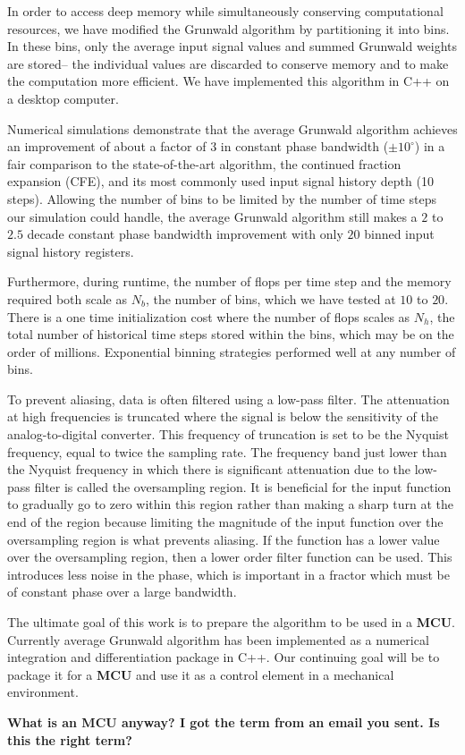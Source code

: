 In order to access deep memory while simultaneously conserving computational resources, we have modified the Grunwald algorithm by partitioning it into bins. In these bins, only the average input signal values and summed Grunwald weights are stored-- the individual values are discarded to conserve memory and to make the computation more efficient. We have implemented this algorithm in C++ on a desktop computer. 

Numerical simulations demonstrate that the average Grunwald algorithm achieves an improvement of about a factor of $3$ in constant phase bandwidth ($\pm 10^\circ$) in a fair comparison to the state-of-the-art algorithm, the continued fraction expansion (CFE), and its most commonly used input signal history depth (10 steps). Allowing the number of bins to be limited by the number of time steps our simulation could handle, the average Grunwald algorithm still makes a $2$ to $2.5$ decade constant phase bandwidth improvement with only $20$ binned input signal history registers. 

Furthermore, during runtime, the number of flops per time step and the memory required both scale as $N_b$, the number of bins, which we have tested at $10$ to $20$. There is a one time initialization cost where the number of flops scales as $N_h$, the total number of historical time steps stored within the bins, which may be on the order of millions. Exponential binning strategies performed well at any number of bins. 

To prevent aliasing, data is often filtered using a low-pass filter. The attenuation at high frequencies is truncated where the signal is below the sensitivity of the analog-to-digital converter. This frequency of truncation is set to be the Nyquist frequency, equal to twice the sampling rate. The frequency band just lower than the Nyquist frequency in which there is significant attenuation due to the low-pass filter is called the oversampling region. It is beneficial for the input function to gradually go to zero within this region rather than making a sharp turn at the end of the region because limiting the magnitude of the input function over the oversampling region is what prevents aliasing. If the function has a lower value over the oversampling region, then a lower order filter function can be used. This introduces less noise in the phase, which is important in a fractor which must be of constant phase over a large bandwidth. 

The ultimate goal of this work is to prepare the algorithm to be used in a {\bf MCU}. Currently average Grunwald algorithm has been implemented as a numerical integration and differentiation package in C++. Our continuing goal will be to package it for a {\bf MCU} and use it as a control element in a mechanical environment.  

{\bf What is an MCU anyway? I got the term from an email you sent. Is this the right term?}